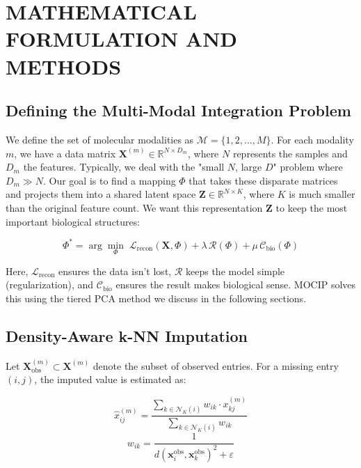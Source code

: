 \documentclass[twocolumn]{article}
\begin{document}
\section{\uppercase{Mathematical Formulation and Methods}}

\subsection{Defining the Multi-Modal Integration Problem}
We define the set of molecular modalities as $\mathcal{M} = \{1, 2, \ldots, M\}$. For each modality $m$, we have a data matrix $\mathbf{X}^{(m)} \in \mathbb{R}^{N \times D_m}$, where $N$ represents the samples and $D_m$ the features. Typically, we deal with the "small $N$, large $D$" problem where $D_m \gg N$. Our goal is to find a mapping $\Phi$ that takes these disparate matrices and projects them into a shared latent space $\mathbf{Z} \in \mathbb{R}^{N \times K}$, where $K$ is much smaller than the original feature count. We want this representation $\mathbf{Z}$ to keep the most important biological structures:

\begin{equation}
\Phi^{*} = \arg\min_{\Phi} \; \mathcal{L}_{\text{recon}}(\mathbf{X}, \Phi) + \lambda \, \mathcal{R}(\Phi) + \mu \, \mathcal{C}_{\text{bio}}(\Phi)
\end{equation}

Here, $\mathcal{L}_{\text{recon}}$ ensures the data isn't lost, $\mathcal{R}$ keeps the model simple (regularization), and $\mathcal{C}_{\text{bio}}$ ensures the result makes biological sense. MOCIP solves this using the tiered PCA method we discuss in the following sections.

\subsection{Density-Aware k-NN Imputation}
Let $\mathbf{X}^{(m)}_{\text{obs}} \subset \mathbf{X}^{(m)}$ denote the subset of observed entries. For a missing entry $(i, j)$, the imputed value is estimated as:

\begin{equation}
\hat{x}^{(m)}_{ij} = \frac{\sum_{k \in \mathcal{N}_K(i)} w_{ik} \cdot x^{(m)}_{kj}}{\sum_{k \in \mathcal{N}_K(i)} w_{ik}}
\end{equation}
\begin{equation}
w_{ik} = \frac{1}{d(\mathbf{x}_i^{\text{obs}}, \mathbf{x}_k^{\text{obs}})^2 + \varepsilon}
\end{equation}
\end{document}
